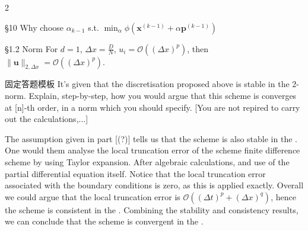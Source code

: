 \documentclass{note}
\begin{document}
\begin{multicols}{2}
{{\begin{MyTh}{§10 Why choose $\alpha_{k-1}$ s.t. $\min_{\alpha} \phi(\mathbf{x}^{(k-1)}+\alpha \mathbf{p}^{(k-1)})$}
        \quad {}

        \quad {}
    \end{MyTh}

    \begin{MyTh}{§1.2 Norm}
        For $d=1$, $\Delta x = \frac DN$, $u_i = \mathcal{O}((\Delta x)^p)$, then $\|\mathbf{u}\|_{2,\Delta x} = \mathcal{O}((\Delta x)^p)$.

        \quad {}

        \quad {}

        \quad {} 

        \quad {}

        \quad \hspace{23pt}

        \quad {}
    \end{MyTh}

    \begin{MyTh}{固定答题模板}
        It's given that the discretisation proposed above is stable in the 2-norm. Explain, step-by-step, how you would argue that this scheme is converges at [n]-th order, in a norm which you should specify. [You are not repired to carry out the calculations,...]

        \quad {} The assumption given in part [(?)] tells us that the scheme is also stable in the . One would them analyse the local truncation error of the scheme finite difference scheme by using Taylor expansion. After algebraic calculations, and use of the partial differential equation itself. Notice that the local truncation error associated with the boundary conditions is zero, as this is applied exactly. Overall we could argue that the local truncation error is $\mathcal{O}((\Delta t)^p + (\Delta x)^q)$, hence the scheme is consistent in the . Combining the stability and consistency results, we can conclude that the scheme is convergent in the .


\end{MyTh}}}
\end{multicols}
\end{document}
